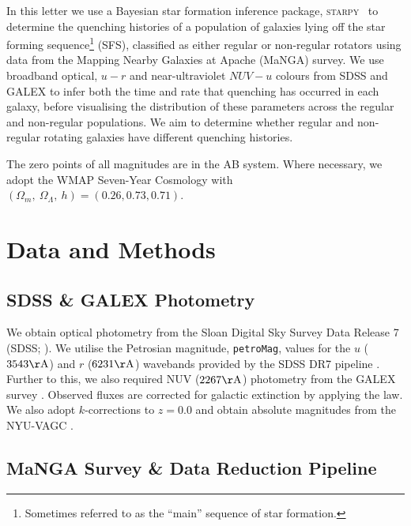 \documentclass[useAMS,usenatbib]{mn2e}
\begin{document}
In this letter we use a Bayesian star formation inference package, \textsc{starpy}~ to determine the quenching histories of a population of galaxies lying off the star forming sequence\footnote{Sometimes referred to as the ``main'' sequence of star formation.} (SFS), classified as either regular or non-regular rotators using data from the Mapping Nearby Galaxies at Apache (MaNGA) survey. We use broadband optical, $u-r$ and near-ultraviolet $NUV-u$ colours from SDSS and GALEX to infer both the time and rate that quenching has occurred in each galaxy, before visualising the distribution of these parameters across the regular and non-regular populations. We aim to determine whether regular and non-regular rotating galaxies have different quenching histories. 

The zero points of all magnitudes are in the AB system. Where necessary, we adopt the WMAP Seven-Year Cosmology \citep{jarosik11} with $(\Omega_m , ~\Omega_\Lambda , ~h) = (0.26, 0.73, 0.71)$.



\section{Data and Methods}\label{sec:datamethods}

\subsection{SDSS \& GALEX Photometry}\label{sec:photom}

We obtain optical photometry from the Sloan Digital Sky Survey Data Release 7 (SDSS; \citealt{york00, abazajian09}). We utilise the Petrosian magnitude, {\tt petroMag}, values for the $u$ ($3543 \rm{\AA}$) and $r$ ($6231 \rm{\AA}$) wavebands provided by the SDSS DR7 pipeline \citep{stoughton02}. Further to this, we also required NUV ($2267 \rm{\AA}$) photometry from the GALEX survey \citep{martin05}. Observed fluxes are corrected for galactic extinction \citep{Oh11} by applying the \citet*{Cardelli89} law. We also adopt $k$-corrections to $z = 0.0$ and obtain absolute magnitudes from the NYU-VAGC \citep{blanton05, padmanabhan08, blanton07}.

\subsection{MaNGA Survey \& Data Reduction Pipeline}\label{sec:manga}
\end{document}
